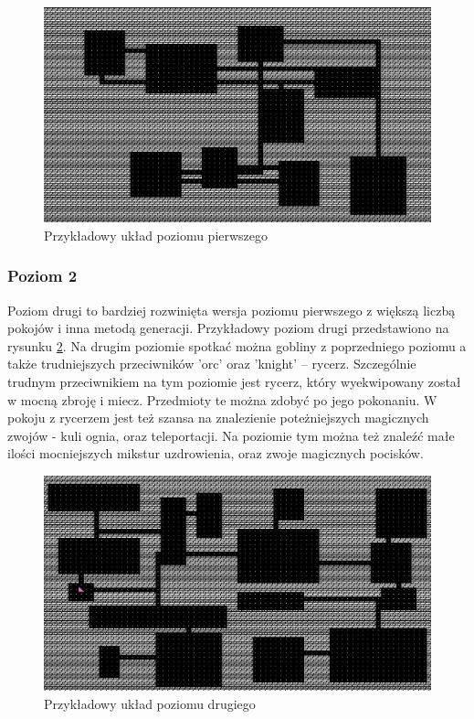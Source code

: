 \documentclass[12pt,twoside]{article}
\begin{document}
\FloatBarrier
\begin{figure}[h]
	\centering
	\includegraphics[width=12cm]{images/mygame/map1.png}
	\caption{Przykładowy układ poziomu pierwszego}
	\label{mygame:map1}
\end{figure}
\FloatBarrier


\subsubsection{Poziom 2}
Poziom drugi to bardziej rozwinięta wersja poziomu pierwszego z większą liczbą pokojów i inna metodą generacji. Przykładowy poziom drugi przedstawiono na rysunku \ref{mygame:map2}. Na drugim poziomie spotkać można gobliny z poprzedniego poziomu a także trudniejszych przeciwników 'orc' oraz 'knight' -- rycerz. Szczególnie trudnym przeciwnikiem na tym poziomie jest rycerz, który wyekwipowany został w mocną zbroję i miecz. Przedmioty te można zdobyć  po jego pokonaniu. W pokoju z rycerzem jest też szansa na znalezienie poteżniejszych magicznych zwojów - kuli ognia, oraz  teleportacji. Na poziomie tym można też znaleźć małe ilości mocniejszych mikstur uzdrowienia, oraz zwoje magicznych pocisków.


\FloatBarrier
\begin{figure}[h]
	\centering
	\includegraphics[width=14cm]{images/mygame/map2.png}
	\caption{Przykładowy układ poziomu drugiego}
	\label{mygame:map2}
\end{figure}
\FloatBarrier
\end{document}
